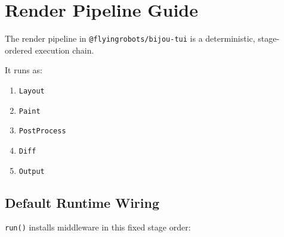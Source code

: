 \chapter{Render Pipeline Guide}\label{record-014}

\smallskip

The render pipeline in \texttt{@\allowbreak{}f\allowbreak{}l\allowbreak{}y\allowbreak{}i\allowbreak{}n\allowbreak{}g\allowbreak{}r\allowbreak{}o\allowbreak{}b\allowbreak{}o\allowbreak{}t\allowbreak{}s\allowbreak{}/\allowbreak{}b\allowbreak{}i\allowbreak{}j\allowbreak{}o\allowbreak{}u\allowbreak{}-\allowbreak{}t\allowbreak{}u\allowbreak{}i} is a deterministic, stage-ordered execution chain.

It runs as:

\begin{enumerate}
\def\labelenumi{\arabic{enumi}.}
\tightlist
\item
  \texttt{L\allowbreak{}a\allowbreak{}y\allowbreak{}o\allowbreak{}u\allowbreak{}t}
\item
  \texttt{P\allowbreak{}a\allowbreak{}i\allowbreak{}n\allowbreak{}t}
\item
  \texttt{P\allowbreak{}o\allowbreak{}s\allowbreak{}t\allowbreak{}P\allowbreak{}r\allowbreak{}o\allowbreak{}c\allowbreak{}e\allowbreak{}s\allowbreak{}s}
\item
  \texttt{D\allowbreak{}i\allowbreak{}f\allowbreak{}f}
\item
  \texttt{O\allowbreak{}u\allowbreak{}t\allowbreak{}p\allowbreak{}u\allowbreak{}t}
\end{enumerate}

\section{Default Runtime Wiring}\label{record-014-default-runtime-wiring}

\texttt{r\allowbreak{}u\allowbreak{}n\allowbreak{}(\allowbreak{})} installs middleware in this fixed stage order:

